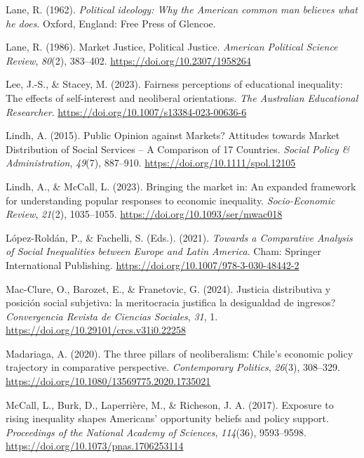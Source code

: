 \documentclass[
  12pt,
]{article}
\newlength{\cslhangindent}
\newenvironment{CSLReferences}[2] %
 {\begin{list}{}{%
  \setlength{\itemindent}{0pt}
  \setlength{\leftmargin}{0pt}
  \setlength{\parsep}{0pt}
  \ifodd #1
   \setlength{\leftmargin}{\cslhangindent}
   \setlength{\itemindent}{-1\cslhangindent}
  \fi
  \setlength{\itemsep}{#2\baselineskip}}}
 {\end{list}}
\begin{document}
\begin{CSLReferences}{1}{0}
Lane, R. (1962). \emph{Political ideology: Why the {American} common man
believes what he does}. Oxford, England: Free Press of Glencoe.

Lane, R. (1986). Market {Justice}, {Political Justice}. \emph{American
Political Science Review}, \emph{80}(2), 383--402.
\url{https://doi.org/10.2307/1958264}

Lee, J.-S., \& Stacey, M. (2023). Fairness perceptions of educational
inequality: The effects of self-interest and neoliberal orientations.
\emph{The Australian Educational Researcher}.
\url{https://doi.org/10.1007/s13384-023-00636-6}

Lindh, A. (2015). Public {Opinion} against {Markets}? {Attitudes}
towards {Market Distribution} of {Social Services} -- {A Comparison} of
17 {Countries}. \emph{Social Policy \& Administration}, \emph{49}(7),
887--910. \url{https://doi.org/10.1111/spol.12105}

Lindh, A., \& McCall, L. (2023). Bringing the market in: An expanded
framework for understanding popular responses to economic inequality.
\emph{Socio-Economic Review}, \emph{21}(2), 1035--1055.
\url{https://doi.org/10.1093/ser/mwac018}

López-Roldán, P., \& Fachelli, S. (Eds.). (2021). \emph{Towards a
{Comparative Analysis} of {Social Inequalities} between {Europe} and
{Latin America}}. Cham: Springer International Publishing.
\url{https://doi.org/10.1007/978-3-030-48442-2}

Mac-Clure, O., Barozet, E., \& Franetovic, G. (2024). {Justicia
distributiva y posici{ó}n social subjetiva: {\textquestiondown}la
meritocracia justifica la desigualdad de ingresos?} \emph{Convergencia
Revista de Ciencias Sociales}, \emph{31}, 1.
\url{https://doi.org/10.29101/crcs.v31i0.22258}

Madariaga, A. (2020). The three pillars of neoliberalism: {Chile}'s
economic policy trajectory in comparative perspective.
\emph{Contemporary Politics}, \emph{26}(3), 308--329.
\url{https://doi.org/10.1080/13569775.2020.1735021}

McCall, L., Burk, D., Laperrière, M., \& Richeson, J. A. (2017).
Exposure to rising inequality shapes {Americans}' opportunity beliefs
and policy support. \emph{Proceedings of the National Academy of
Sciences}, \emph{114}(36), 9593--9598.
\url{https://doi.org/10.1073/pnas.1706253114}


\end{CSLReferences}
\end{document}
